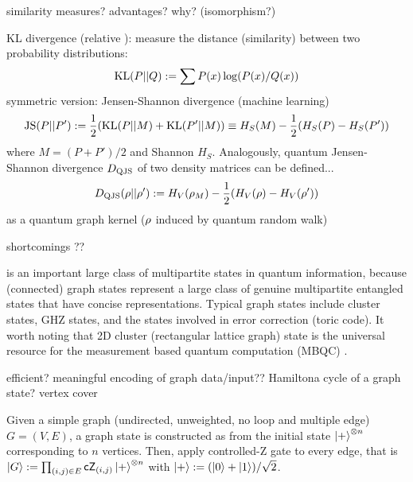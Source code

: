 similarity measures? advantages? why? (isomorphism?)
\begin{definition}[divergence]\label{def:divergence}
	KL divergence (relative ): measure the distance (similarity) between two probability distributions:
	\begin{equation}
		\text{KL} (P || Q) := \sum P(x) \log (P(x)/Q(x))
	\end{equation}
	symmetric version: Jensen-Shannon divergence (machine learning)
	\begin{equation}
		\text{JS} (P || P') := \frac{1}{2} \qty(\text{KL}(P|| M) + \text{KL}(P'||M))
		\equiv H_S(M)-\frac{1}{2} (H_S(P) - H_S(P') ) 
	\end{equation}
	where $M=(P+P')/2$ and Shannon  $H_S$.
	Analogously, quantum Jensen-Shannon divergence $D_{\text{QJS}}$ of two density matrices can be defined...
	\begin{equation}
		D_{\text{QJS}}(\rho||\rho'):= 
		H_V(\rho_M) - \frac{1}{2} (H_V(\rho) - H_V(\rho') ) 
	\end{equation}
	as a quantum graph kernel ($\rho$ induced by quantum random walk)
\end{definition}
\begin{remark}
	\psd
shortcomings ??
\end{remark}
 is an important large class of multipartite states in quantum information,
because (connected) graph states represent a large class of genuine multipartite entangled states that have concise representations.
Typical graph states include cluster states, GHZ states, and the states involved in error correction (toric code).
It worth noting that 2D cluster (rectangular lattice graph) state is the universal resource for the measurement based quantum computation (MBQC) \cite{briegelMeasurementbasedQuantumComputation2009}.
\begin{question}
	efficient? meaningful encoding of graph data/input??
	Hamiltona cycle of a graph state? vertex cover
\end{question}
\begin{definition}\label{def:graph_state}
	Given a simple graph (undirected, unweighted, no loop and multiple edge) $G=(V,E)$, a graph state is constructed as 
	from the initial state $\ket{+}^{\otimes n}$ corresponding to $n$ vertices.
	Then, apply controlled-Z gate to every edge, that is 
	$\ket{G}:=\prod_{(i,j)\in E}\textsf{cZ}_{(i,j)} \ket{+}^{\otimes n}$
	with $\ket{+}: = (\ket{0}+\ket{1})/\sqrt{2}$.
\end{definition}
